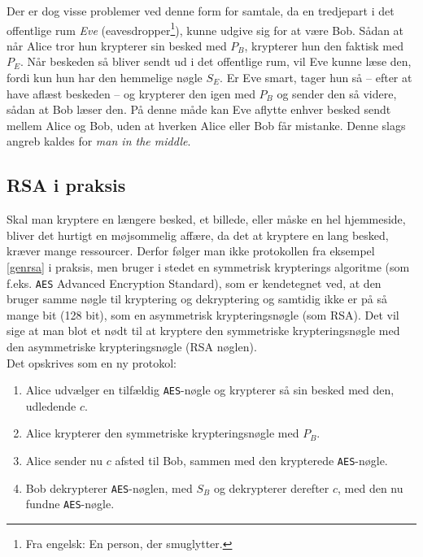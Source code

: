 Der er dog visse problemer ved denne form for samtale, da en tredjepart i det offentlige rum \emph{Eve} (eavesdropper\footnote{Fra engelsk: En person, der smuglytter.}), kunne udgive sig for at være Bob.
Sådan at når Alice tror hun krypterer sin besked med \(P_B\), krypterer hun den faktisk med \(P_E\).
Når beskeden så bliver sendt ud i det offentlige rum, vil Eve kunne læse den, fordi kun hun har den hemmelige nøgle \(S_E\).
Er Eve smart, tager hun så -- efter at have aflæst beskeden -- og krypterer den igen med \(P_B\) og sender den så videre, sådan at Bob læser den.
På denne måde kan Eve aflytte enhver besked sendt mellem Alice og Bob, uden at hverken Alice eller Bob får mistanke.
Denne slags angreb kaldes for \emph{man in the middle}. \cite{ytmitm}


\subsection{RSA i praksis}
Skal man kryptere en længere besked, et billede, eller måske en hel hjemmeside, bliver det hurtigt en møjsommelig affære, da det at kryptere en lang besked, kræver mange ressourcer.
Derfor følger man ikke protokollen fra eksempel \ref{genrsa} i praksis, men bruger i stedet en symmetrisk krypterings algoritme (som f.eks. \texttt{AES} Advanced Encryption Standard), som er kendetegnet ved, at den bruger samme nøgle til kryptering og dekryptering og samtidig ikke er på så mange bit (128 bit), som en asymmetrisk krypteringsnøgle (som RSA). \cite{algoritmer}
Det vil sige at man blot et nødt til at kryptere den symmetriske krypteringsnøgle med den asymmetriske krypteringsnøgle (RSA nøglen). \cite[112]{krypto}\\
Det opskrives som en ny protokol:

\begin{enumerate}[label*=(\arabic*)]
    \item Alice udvælger en tilfældig \texttt{AES}-nøgle og krypterer så sin besked med den, udledende \(c\).
    \item Alice krypterer den symmetriske krypteringsnøgle med \(P_B\).
    \item Alice sender nu \(c\) afsted til Bob, sammen med den krypterede \texttt{AES}-nøgle.
    \item Bob dekrypterer \texttt{AES}-nøglen, med \(S_B\) og dekrypterer derefter \(c\), med den nu fundne \texttt{AES}-nøgle.
\end{enumerate}




